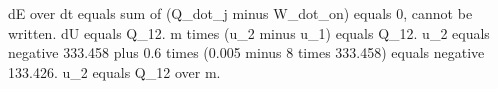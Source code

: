 dE over dt equals sum of (Q_dot_j minus W_dot_on) equals 0, cannot be written.
dU equals Q_12.
m times (u_2 minus u_1) equals Q_12.
u_2 equals negative 333.458 plus 0.6 times (0.005 minus 8 times 333.458) equals negative 133.426.
u_2 equals Q_12 over m.